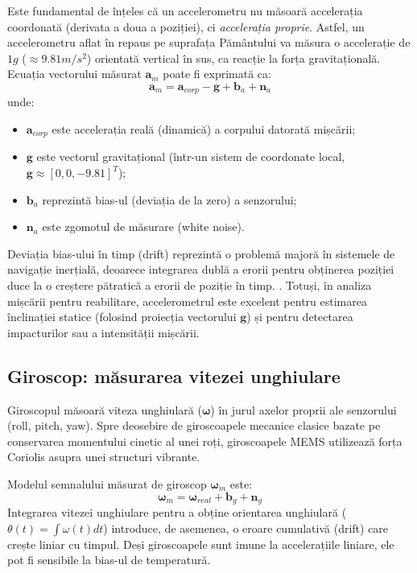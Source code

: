 \hspace{0.75cm}Este fundamental de înțeles că un accelerometru nu măsoară accelerația coordonată (derivata a doua a poziției), ci \textit{accelerația proprie}. 
Astfel, un accelerometru aflat în repaus pe suprafața Pământului va măsura o accelerație de $1g$ ($\approx 9.81 m/s^2$) orientată vertical în sus, 
ca reacție la forța gravitațională. Ecuația vectorului măsurat $\mathbf{a}_{m}$ poate fi exprimată ca:
\begin{equation}
    \mathbf{a}_{m} = \mathbf{a}_{corp} - \mathbf{g} + \mathbf{b}_a + \mathbf{n}_a
\end{equation}
unde:
\begin{itemize}
    \item $\mathbf{a}_{corp}$ este accelerația reală (dinamică) a corpului datorată mișcării;
    \item $\mathbf{g}$ este vectorul gravitațional (într-un sistem de coordonate local, $\mathbf{g} \approx [0, 0, -9.81]^T$);
    \item $\mathbf{b}_a$ reprezintă bias-ul (deviația de la zero) a senzorului;
    \item $\mathbf{n}_a$ este zgomotul de măsurare (white noise).
\end{itemize}

Deviația bias-ului în timp (drift) reprezintă o problemă majoră în sistemele de navigație inerțială, deoarece integrarea dublă a erorii 
pentru obținerea poziției duce la o creștere pătratică a erorii de poziție în timp. \cite{titterton_2004}. 
Totuși, în analiza mișcării pentru reabilitare, accelerometrul este excelent pentru estimarea înclinației statice (folosind proiecția vectorului $\mathbf{g}$) 
și pentru detectarea impacturilor sau a intensității mișcării.

\subsection{Giroscop: măsurarea vitezei unghiulare}
\hspace{0.75cm}Giroscopul măsoară viteza unghiulară ($\boldsymbol{\omega}$) în jurul axelor proprii ale senzorului (roll, pitch, yaw). 
Spre deosebire de giroscoapele mecanice clasice bazate pe conservarea momentului cinetic al unei roți, giroscoapele MEMS utilizează forța Coriolis 
asupra unei structuri vibrante.

\hspace{0.75cm}Modelul semnalului măsurat de giroscop $\boldsymbol{\omega}_{m}$ este:
\begin{equation}
    \boldsymbol{\omega}_{m} = \boldsymbol{\omega}_{real} + \mathbf{b}_g + \mathbf{n}_g
\end{equation}
Integrarea vitezei unghiulare pentru a obține orientarea unghiulară ($\theta(t) = \int \omega(t) dt$) introduce, de asemenea, o eroare cumulativă (drift) 
care crește liniar cu timpul. Deși giroscoapele sunt imune la accelerațiile liniare, ele pot fi sensibile la bias-ul de temperatură.

